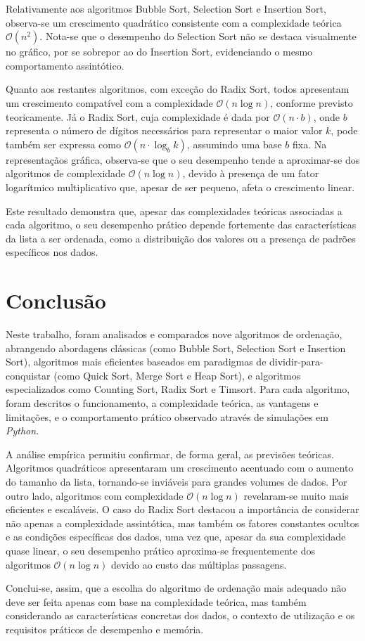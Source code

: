 \documentclass[conference]{IEEEtran}
\begin{document}
Relativamente aos algoritmos Bubble Sort, Selection Sort e Insertion Sort, observa-se um crescimento quadrático consistente com a complexidade teórica \( \mathcal{O}(n^2) \). Nota-se que o desempenho do Selection Sort não se destaca visualmente no gráfico, por se sobrepor ao do Insertion Sort, evidenciando o mesmo comportamento assintótico.

Quanto aos restantes algoritmos, com exceção do Radix Sort, todos apresentam um crescimento compatível com a complexidade \( \mathcal{O}(n \log n) \), conforme previsto teoricamente. Já o Radix Sort, cuja complexidade é dada por \( \mathcal{O}(n \cdot b) \), onde \( b \) representa o número de dígitos necessários para representar o maior valor \( k \), pode também ser expressa como \( \mathcal{O}(n \cdot \log_b k) \), assumindo uma base \( b \) fixa. Na representaçãos gráfica, observa-se que o seu desempenho tende a aproximar-se dos algoritmos de complexidade \( \mathcal{O}(n \log n) \), devido à presença de um fator logarítmico multiplicativo que, apesar de ser pequeno, afeta o crescimento linear.

Este resultado demonstra que, apesar das complexidades teóricas associadas a cada algoritmo, o seu desempenho prático depende fortemente das características da lista a ser ordenada, como a distribuição dos valores ou a presença de padrões específicos nos dados.

\section{Conclusão}

Neste trabalho, foram analisados e comparados nove algoritmos de ordenação, abrangendo abordagens clássicas (como Bubble Sort, Selection Sort e Insertion Sort), algoritmos mais eficientes baseados em paradigmas de dividir-para-conquistar (como Quick Sort, Merge Sort e Heap Sort), e algoritmos especializados como Counting Sort, Radix Sort e Timsort. Para cada algoritmo, foram descritos o funcionamento, a complexidade teórica, as vantagens e limitações, e o comportamento prático observado através de simulações em \textit{Python}.

A análise empírica permitiu confirmar, de forma geral, as previsões teóricas. Algoritmos quadráticos apresentaram um crescimento acentuado com o aumento do tamanho da lista, tornando-se inviáveis para grandes volumes de dados. Por outro lado, algoritmos com complexidade \( \mathcal{O}(n \log n) \) revelaram-se muito mais eficientes e escaláveis. O caso do Radix Sort destacou a importância de considerar não apenas a complexidade assintótica, mas também os fatores constantes ocultos e as condições específicas dos dados, uma vez que, apesar da sua complexidade quase linear, o seu desempenho prático aproxima-se frequentemente dos algoritmos \( \mathcal{O}(n \log n) \) devido ao custo das múltiplas passagens.

Conclui-se, assim, que a escolha do algoritmo de ordenação mais adequado não deve ser feita apenas com base na complexidade teórica, mas também considerando as características concretas dos dados, o contexto de utilização e os requisitos práticos de desempenho e memória.

\nocite{*}


\end{document}
